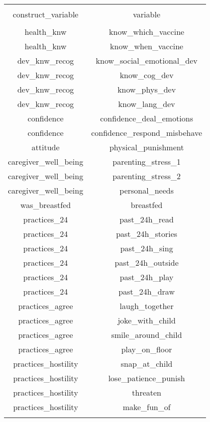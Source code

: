 
\begin{table}[!htbp] \centering 
  \caption{} 
  \label{tbl:construct variable mapping} 
\begin{tabular}{@{\extracolsep{5pt}} cc} 
\\[-1.8ex]\hline 
\hline \\[-1.8ex] 
construct\_variable & variable \\ 
\hline \\[-1.8ex] 
health\_knw & know\_which\_vaccine \\ 
health\_knw & know\_when\_vaccine \\ 
dev\_knw\_recog & know\_social\_emotional\_dev \\ 
dev\_knw\_recog & know\_cog\_dev \\ 
dev\_knw\_recog & know\_phys\_dev \\ 
dev\_knw\_recog & know\_lang\_dev \\ 
confidence & confidence\_deal\_emotions \\ 
confidence & confidence\_respond\_misbehave \\ 
attitude & physical\_punishment \\ 
caregiver\_well\_being & parenting\_stress\_1 \\ 
caregiver\_well\_being & parenting\_stress\_2 \\ 
caregiver\_well\_being & personal\_needs \\ 
was\_breastfed & breastfed \\ 
practices\_24 & past\_24h\_read \\ 
practices\_24 & past\_24h\_stories \\ 
practices\_24 & past\_24h\_sing \\ 
practices\_24 & past\_24h\_outside \\ 
practices\_24 & past\_24h\_play \\ 
practices\_24 & past\_24h\_draw \\ 
practices\_agree & laugh\_together \\ 
practices\_agree & joke\_with\_child \\ 
practices\_agree & smile\_around\_child \\ 
practices\_agree & play\_on\_floor \\ 
practices\_hostility & snap\_at\_child \\ 
practices\_hostility & lose\_patience\_punish \\ 
practices\_hostility & threaten \\ 
practices\_hostility & make\_fun\_of \\ 
\hline \\[-1.8ex] 
\end{tabular} 
\end{table} 
